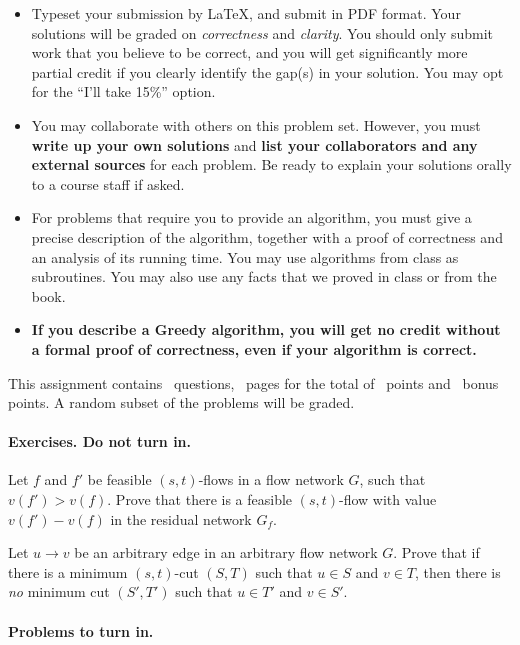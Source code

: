 \begin{itemize} 
\item Typeset your submission by \LaTeX, and submit in PDF
  format. Your solutions will be graded on \emph{correctness} and
  \emph{clarity}. You should only submit work that you believe to be
  correct, and you will get significantly more partial credit if you
  clearly identify the gap(s) in your solution. You may opt for the
  ``I’ll take 15\%'' option.
\item You may collaborate with others on this problem set.  However,
  you must \textbf{{write up your own solutions}} and \textbf{{list
      your collaborators and any external sources}} for each
  problem. Be ready to explain your solutions orally to a course staff
  if asked.
\item For problems that require you to provide an algorithm, you must
  give a precise description of the algorithm, together with a proof
  of correctness and an analysis of its running time. You may use
  algorithms from class as subroutines. You may also use any facts
  that we proved in class or from the book.
\item \textbf{If you describe a Greedy algorithm, you will get no
    credit without a formal proof of correctness, even if your
    algorithm is correct.}
\end{itemize}

\noindent This assignment contains \numquestions\ questions,
\numpages\ pages for the total of \numpoints \ points and
\numbonuspoints\ bonus points. A random subset of the problems will be
graded. \medskip

\paragraph{Exercises. Do not turn in.}
\begin{questions}
\question Let $f$ and $f'$ be feasible $(s,t)$-flows in a flow network
  $G$, such that $v(f') > v(f)$. Prove that there is a feasible
  $(s,t)$-flow with value $v(f') - v(f)$ in the residual network
  $G_f$.

\question Let $u\to v$ be an arbitrary edge in an arbitrary flow
  network $G$. Prove that if there is a minimum $(s,t)$-cut $(S,T)$
  such that $u\in S$ and $v\in T$, then there is \emph{no} minimum cut
  $(S',T')$ such that $u\in T'$ and $v\in S'$. 
\end{questions}
\newpage 
\paragraph{Problems to turn in.}

